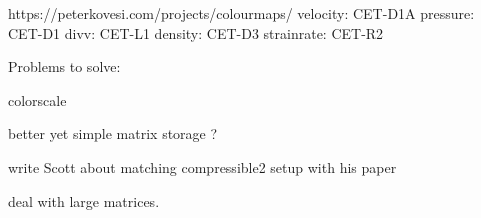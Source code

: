 \documentclass[a4paper]{article}
\begin{document}
https://peterkovesi.com/projects/colourmaps/
velocity: CET-D1A
pressure: CET-D1
divv: CET-L1
density: CET-D3
strainrate: CET-R2





\noindent Problems to solve:

colorscale 

better yet simple matrix storage ?

write Scott about matching compressible2 setup with his paper

deal with large matrices. 









\newpage
\end{document}
